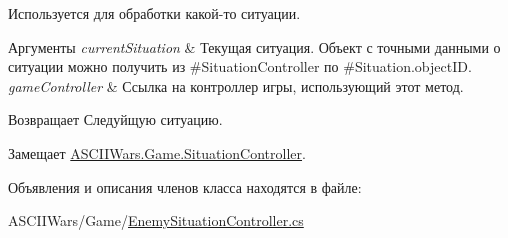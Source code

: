 Используется для обработки какой-\/то ситуации. 


\begin{DoxyParams}{Аргументы}
{\em current\+Situation} & Текущая ситуация. Объект с точными данными о ситуации можно получить из \#\+Situation\+Controller по \#\+Situation.\+object\+ID. \\
\hline
{\em game\+Controller} & Ссылка на контроллер игры, использующий этот метод. \\
\hline
\end{DoxyParams}
\begin{DoxyReturn}{Возвращает}
Следуйщую ситуацию. 
\end{DoxyReturn}


Замещает \hyperlink{interface_a_s_c_i_i_wars_1_1_game_1_1_situation_controller_a2cf0359dfc1683beb63f0dfed1c372e6}{A\+S\+C\+I\+I\+Wars.\+Game.\+Situation\+Controller}.



Объявления и описания членов класса находятся в файле\+:\begin{DoxyCompactItemize}
\item 
A\+S\+C\+I\+I\+Wars/\+Game/\hyperlink{_enemy_situation_controller_8cs}{Enemy\+Situation\+Controller.\+cs}\end{DoxyCompactItemize}

